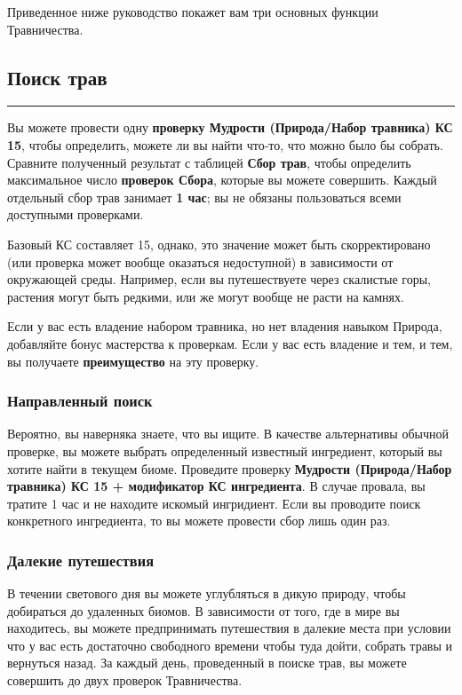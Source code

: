 \documentclass[a4paper, 9pt, twocolumn]{book}
\newcommand{\newsubsection}[1]{
	{\subsection{#1}}
	\vskip -0.45cm
	\noindent
	\rule{\linewidth}{1.8pt}
}
\begin{document}
	Приведенное ниже руководство покажет вам три основных функции Травничества.
	
	\newsubsection{Поиск трав}
	
	Вы можете провести одну \textbf{проверку Мудрости (Природа/Набор травника) КС 15}, чтобы определить, можете ли вы найти что-то, что можно было бы собрать. Сравните полученный результат с таблицей \textbf{Сбор трав}, чтобы определить максимальное число \textbf{проверок Сбора}, которые вы можете совершить. Каждый отдельный сбор трав занимает \textbf{1 час}; вы не обязаны пользоваться всеми доступными проверками.
	
	Базовый КС составляет 15, однако, это значение может быть скорректировано (или проверка может вообще оказаться недоступной) в зависимости от окружающей среды. Например, если вы путешествуете через скалистые горы, растения могут быть редкими, или же могут вообще не расти на камнях.
	
	Если у вас есть владение набором травника, но нет владения навыком Природа, добавляйте бонус мастерства к проверкам. Если у вас есть владение и тем, и тем, вы получаете \textbf{преимущество} на эту проверку.
	
	\subsubsection*{Направленный поиск}
	
	Вероятно, вы наверняка знаете, что вы ищите. В качестве альтернативы обычной проверке, вы можете выбрать определенный известный ингредиент, который вы хотите найти в текущем биоме. Проведите проверку \textbf{Мудрости (Природа/Набор травника) КС 15 + модификатор КС ингредиента}. В случае провала, вы тратите 1 час и не находите искомый ингридиент. Если вы проводите поиск конкретного ингредиента, то вы можете провести сбор лишь один раз.
	
	\subsubsection*{Далекие путешествия}
	
	В течении светового дня вы можете углубляться в дикую природу, чтобы добираться до удаленных биомов. В зависимости от того, где в мире вы находитесь, вы можете предпринимать путешествия в далекие места при условии что у вас есть достаточно свободного времени чтобы туда дойти, собрать травы и вернуться назад. За каждый день, проведенный в поиске трав, вы можете совершить до двух проверок Травничества.
	
\end{document}
